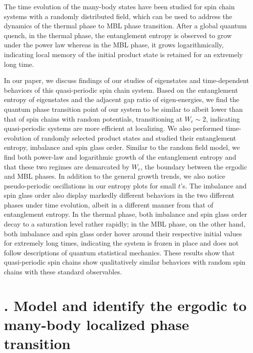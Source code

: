\documentclass[prl,aps,epsf,showpacs,twocolumn]{revtex4}
\let\oldsection\section
\renewcommand{\section}[1]{\stepcounter{section}\oldsection{\Roman{section}. #1}}
\begin{document}
The time evolution of the many-body states have been studied for spin chain
systems with a randomly distributed field\cite{kjall2014,luitz2016time}, which
can be used to address the dynamics of the thermal phase to MBL phase
transition\cite{nandkishore2015,vosk_theory2014,potter2015}.
After a global quantum quench, in the thermal phase, the entanglement entropy is
observed to grow under the power law whereas in the MBL phase, it grows
logarithmically, indicating local memory of the initial product state is
retained for an extremely long time.


In our paper, we discuss findings of our studies of eigenstates and
time-dependent behaviors of this quasi-periodic spin chain system.
Based on the entanglement entropy of eigenstates and the adjacent gap ratio of
eigen-energies, we find the quantum phase transition point of our system to be
similar to albeit lower than that of spin chains with random potentials,
transitioning at $W_c \sim 2$, indicating quasi-periodic systems are more
efficient at localizing.
We also performed time-evolution of randomly selected product states and studied
their entanglement entropy, imbalance and spin glass order.
Similar to the random field model, we find both power-law and logarithmic growth
of the entanglement entropy and that these two regimes are demarcated by
$W_c$, the boundary between the ergodic and MBL phases.
In addition to the general growth trends, we also notice pseudo-periodic
oscillations in our entropy plots for small $t$'s.
The imbalance and spin glass order also display markedly different behaviors in
the two different phases under time evolution, albeit in a different manner from
that of entanglement entropy.
In the thermal phase, both imbalance and spin glass order decay to a saturation
level rather rapidly; in the MBL phase, on the other hand, both imbalance and
spin glass order hover around their respective initial values for extremely long
times, indicating the system is frozen in place and does not follow descriptions
of quantum statistical mechanics.
These results show that quasi-periodic spin chains show qualitatively similar
behaviors with random spin chains with these standard observables.


\section{Model and identify the ergodic to many-body localized phase transition}
\end{document}

